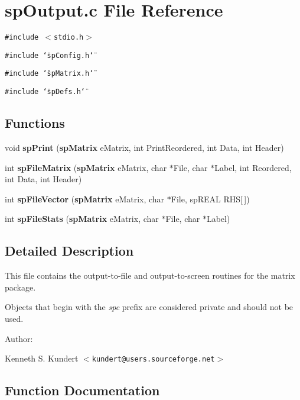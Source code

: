 \section{sp\-Output.c File Reference}
\label{spOutput_8c}
{\tt \#include $<$stdio.h$>$}\par
{\tt \#include \char`\"{}sp\-Config.h\char`\"{}}\par
{\tt \#include \char`\"{}sp\-Matrix.h\char`\"{}}\par
{\tt \#include \char`\"{}sp\-Defs.h\char`\"{}}\par
\subsection*{Functions}
\begin{CompactItemize}
\item 
void {\bf sp\-Print} ({\bf sp\-Matrix} e\-Matrix, int Print\-Reordered, int Data, int Header)
\item 
int {\bf sp\-File\-Matrix} ({\bf sp\-Matrix} e\-Matrix, char $\ast$File, char $\ast$Label, int Reordered, int Data, int Header)
\item 
int {\bf sp\-File\-Vector} ({\bf sp\-Matrix} e\-Matrix, char $\ast$File, sp\-REAL RHS[$\,$])
\item 
int {\bf sp\-File\-Stats} ({\bf sp\-Matrix} e\-Matrix, char $\ast$File, char $\ast$Label)
\end{CompactItemize}


\subsection{Detailed Description}
  This file contains the output-to-file and output-to-screen routines for the matrix package.

Objects that begin with the {\em spc} prefix are considered private and should not be used.

\begin{Desc}
\item[Author: ]\par
 Kenneth S. Kundert $<${\tt kundert@users.sourceforge.net}$>$\end{Desc}


\subsection{Function Documentation}
